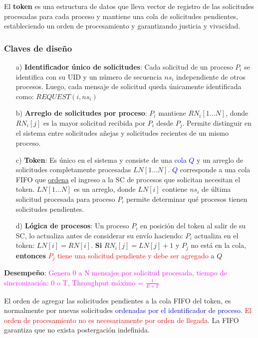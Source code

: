 El \textbf{token} es una estructura de datos que lleva  vector de registro de las solicitudes procesadas para cada proceso y mantiene una cola de solicitudes pendientes, estableciendo un orden de procesamiento y garantizando justicia y vivacidad.

\subsubsection{Claves de diseño}
\begin{itemize}
    \item[a)] \textbf{Identificador único de solicitudes}: Cada solicitud de un proceso $P_i$ se identifica con su UID y un número de secuencia $ns_i$ independiente de otros procesos. Luego, cada mensaje de solicitud queda únicamente identificada como: $REQUEST(i, ns_i)$
    \item[b)] \textbf{Arreglo de solicitudes por proceso}: $P_i$ mantiene $RN_i[1\ldots N]$, donde $RN_i[j]$ es la mayor solicitud recibida por $P_i$ desde $P_j$. Permite distinguir en el sistema entre solicitudes a\~{n}ejas y solicitudes recientes de un mismo proceso.
    \item[c)] \textbf{Token}: Es único en el sistema y consiste de una \textcolor{blue}{cola $Q$} y un arreglo de solicitudes completamente procesadas $LN[1 \ldots N]$. \textcolor{blue}{$Q$} corresponde a una cola FIFO que \underline{ordena} el ingreso a la SC de procesos que solicitan necesitan el token.  $LN[1 \ldots N]$ es un arreglo, donde $LN[i]$ contiene $ns_i$ de última solicitud procesada para proceso $P_i$  permite determinar qué procesos tienen solicitudes pendientes.
    \item[d)] \textbf{Lógica de procesos}: Un proceso $P_i$ en posición del token al salir de su SC, lo actualiza antes de considerar su envío haciendo: $P_i$ actualiza en el token: $LN[i] = RN[i]$. \textbf{Si} $RN_i[j] = LN[j] + 1$ y $P_j$ no está en la cola, \textbf{entonces} \textcolor{red}{$P_j$ tiene una solicitud pendiente y debe ser agregado }a $Q$
\end{itemize}

\textbf{Desempeño}: \textcolor{magenta}{Genera 0 a N mensajes por solicitud procesada, tiempo de sincronización: 0 o T, Throughput máximo = $\frac{1}{E+T}$}

El orden de agregar las solicitudes pendientes a la cola FIFO del token, es normalmente por nuevas solicitudes \textcolor{blue}{ordenadas por el identificador de proceso}. \textcolor{red}{El orden de procesamiento no es necesariamente por orden de llegada}. La FIFO garantiza que no exista postergación indefinida. 
